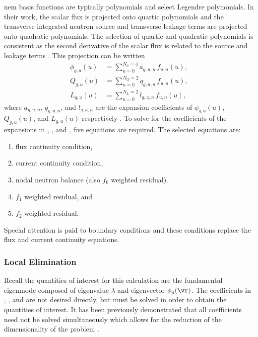     \gls{nem} basis functions are typically polynomials and
    \citeauthor{qe2paper} select Legendre polynomials. In their work, the scalar
    flux is projected onto quartic polynomials and the transverse integrated
    neutron source and transverse leakage terms are projected onto quadratic
    polynomials. The selection of quartic and quadratic polynomials is
    consistent as the second derivative of the scalar flux is related to the
    source and leakage terms \cite{gehinThesis}. This projection can be written
    \begin{align}
      \label{eq:flux_expansion}
      \phi_{g,u}(u) &= \sum_{n=0}^{N_{\phi} = 4} a_{g,u,n} \, f_{u,n}(u), \\
      \label{eq:source_expansion}
      Q_{g,u}(u)    &= \sum_{n=0}^{N_Q = 2}      q_{g,u,n} \, f_{u,n}(u), \\
      \label{eq:leakage_expansion}
      L_{g,u}(u)    &= \sum_{n=0}^{N_L = 2}      l_{g,u,n} \, f_{u,n}(u),
    \end{align}
    where $a_{g,u,n}$, $q_{g,u,n}$, and $l_{g,u,n}$ are the expansion
    coefficients of $\phi_{g,u}(u)$, $Q_{g,u}(u)$, and $L_{g,u}(u)$ respectively
    \cite{qe2paper}. To solve for the coefficients of the expansions in
    , , and
    , five equations are required. The selected
    equations are:
    \begin{enumerate}
      \item flux continuity condition,
      \item current continuity condition,
      \item nodal neutron balance (also $f_0$ weighted residual).
      \item $f_1$ weighted residual, and
      \item $f_2$ weighted residual.
    \end{enumerate}
    Special attention is paid to boundary conditions and these conditions 
    replace the flux and current continuity equations.

    \subsubsection{Local Elimination}
      Recall the quantities of interest for this calculation are the fundamental
      eigenmode composed of eigenvalue $\lambda$ and eigenvector $\phi_g(\vr)$.
      The coefficients in , ,
      and  are not desired directly, but must be
      solved in order to obtain the quantities of interest. It has been
      previously demonstrated that all coefficients need not be solved
      simultaneously which allows for the reduction of the dimensionality of the
      problem \cite{gehinThesis}.

